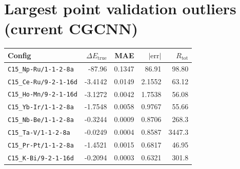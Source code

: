 \documentclass[11pt,a4paper]{article}
\begin{document}
\section*{Largest point validation outliers (current CGCNN)}

\begin{center}
\footnotesize
\begin{tabular}{l r r r r}
  \toprule
  Config & $\Delta E_{\mathrm{true}}$ & MAE & $|\mathrm{err}|$ & $R_{\mathrm{tot}}$ \\
  \midrule
  \texttt{C15\_Np-Ru/1-1-2-8a} & -87.96 & 0.1347 & 86.91 & 98.80 \\
  \texttt{C15\_Ce-Ru/9-2-1-16d} & -3.4142 & 0.0149 & 2.1552 & 63.12 \\
  \texttt{C15\_Ho-Mn/9-2-1-16d} & -3.1272 & 0.0042 & 1.7538 & 56.08 \\
  \texttt{C15\_Yb-Ir/1-1-2-8a} & -1.7548 & 0.0058 & 0.9767 & 55.66 \\
  \texttt{C15\_Nb-Be/1-1-2-8a} & -0.3244 & 0.0009 & 0.8706 & 268.3 \\
  \texttt{C15\_Ta-V/1-1-2-8a} & -0.0249 & 0.0004 & 0.8587 & 3447.3 \\
  \texttt{C15\_Pr-Pt/1-1-2-8a} & -1.4521 & 0.0015 & 0.6817 & 46.95 \\
  \texttt{C15\_K-Bi/9-2-1-16d} & -0.2094 & 0.0003 & 0.6321 & 301.8 \\
  \bottomrule
\end{tabular}
\end{center}
\end{document}
